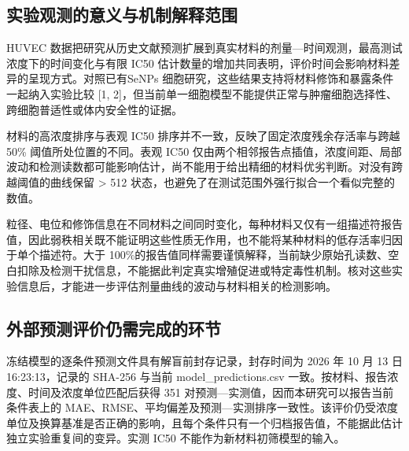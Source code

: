 \subsection{实验观测的意义与机制解释范围}

HUVEC 数据把研究从历史文献预测扩展到真实材料的剂量—时间观测，最高测试浓度下的时间变化与有限 IC50 估计数量的增加共同表明，评价时间会影响材料差异的呈现方式。对照已有SeNPs 细胞研究，这些结果支持将材料修饰和暴露条件一起纳入实验比较 [1, 2]，但当前单一细胞模型不能提供正常与肿瘤细胞选择性、跨细胞普适性或体内安全性的证据。

材料的高浓度排序与表观 IC50 排序并不一致，反映了固定浓度残余存活率与跨越 50\% 阈值所处位置的不同。表观 IC50 仅由两个相邻报告点插值，浓度间距、局部波动和检测读数都可能影响估计，尚不能用于给出精细的材料优劣判断。对没有跨越阈值的曲线保留 > 512 状态，也避免了在测试范围外强行拟合一个看似完整的数值。

粒径、电位和修饰信息在不同材料之间同时变化，每种材料又仅有一组描述符报告值，因此弱秩相关既不能证明这些性质无作用，也不能将某种材料的低存活率归因于单个描述符。大于 100\%的报告值同样需要谨慎解释，当前缺少原始孔读数、空白扣除及检测干扰信息，不能据此判定真实增殖促进或特定毒性机制。核对这些实验信息后，才能进一步评估剂量曲线的波动与材料相关的检测影响。

\subsection{外部预测评价仍需完成的环节}

冻结模型的逐条件预测文件具有解盲前封存记录，封存时间为 2026 年 10 月 13 日 16:23:13，记录的 SHA-256 与当前 model\_predictions.csv 一致。按材料、报告浓度、时间及浓度单位匹配后获得 351 对预测—实测值，因而本研究可以报告当前条件表上的 MAE、RMSE、平均偏差及预测—实测排序一致性。该评价仍受浓度单位及换算基准是否正确的影响，且每个条件只有一个归档报告值，不能据此估计独立实验重复间的变异。实测 IC50 不能作为新材料初筛模型的输入。
